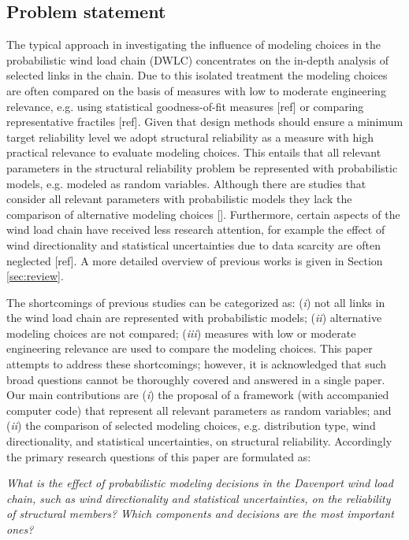 \documentclass[fleqn]{article}
\begin{document}
\subsection{Problem statement}

The typical approach in investigating the influence of modeling choices in the probabilistic wind load chain (DWLC) concentrates on the in-depth analysis of selected links in the chain. Due to this isolated treatment the modeling choices are often compared on the basis of measures with low to moderate engineering relevance, e.g. using statistical goodness-of-fit measures [ref] or comparing representative fractiles [ref]. Given that design methods should ensure a minimum target reliability level we adopt structural reliability as a measure with high practical relevance to evaluate modeling choices. This entails that all relevant parameters in the structural reliability problem be represented with probabilistic models, e.g. modeled as random variables. Although there are studies that consider all relevant parameters with probabilistic models they lack the comparison of alternative modeling choices []. Furthermore, certain aspects of the wind load chain have received less research attention, for example the effect of wind directionality and statistical uncertainties due to data scarcity are often neglected [ref]. A more detailed overview of previous works is given in Section \ref{sec:review}.

The shortcomings of previous studies can be categorized as: (\textit{i}) not all links in the wind load chain are represented with probabilistic models; (\textit{ii}) alternative modeling choices are not compared; (\textit{iii}) measures with low or moderate engineering relevance are used to compare the modeling choices.
This paper attempts to address these shortcomings; however, it is acknowledged that such broad questions cannot be thoroughly covered and answered in a single paper. Our main contributions are (\textit{i}) the proposal of a framework (with accompanied computer code) that represent all relevant parameters as random variables; and (\textit{ii}) the comparison of selected modeling choices, e.g. distribution type, wind directionality, and statistical uncertainties, on structural reliability. Accordingly the primary research questions of this paper are formulated as:

\textit{What is the effect of probabilistic modeling decisions in the Davenport wind load chain, such as wind directionality and statistical uncertainties, on the reliability of structural members? Which components and decisions are the most important ones?}
\end{document}
